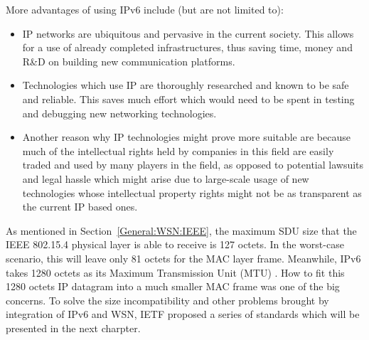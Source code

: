 More advantages of using IPv6 include (but are not limited to):  
\begin{itemize}
\item IP networks are ubiquitous and pervasive in the current society.  This allows for a use of already completed infrastructures, thus saving time, money and R\&D on building new communication platforms.
\newline
 
\item Technologies which use IP are thoroughly researched and known to be safe and reliable.  This saves much effort which would need to be spent in testing and debugging new networking technologies. 
\newline

\item Another reason why IP technologies might prove more suitable are because much of the intellectual rights held by companies in this field are easily traded and used by many players in the field, as opposed to potential lawsuits and legal hassle which might arise due to large-scale usage of new technologies whose intellectual property rights might not be as transparent as the current IP based ones.
\newline

\end{itemize}

As mentioned in Section~\ref{General:WSN:IEEE}, the maximum SDU size that the IEEE 802.15.4 physical layer is able to receive is 127 octets. In the worst-case scenario, this will leave only 81 octets for the MAC layer frame. Meanwhile, IPv6 takes 1280 octets as its Maximum Transmission Unit (MTU) \cite{RFC 4919}. How to fit this 1280 octets IP datagram into a much smaller MAC frame was one of the big concerns. To solve the  size incompatibility and other problems brought by integration of IPv6 and WSN, IETF proposed a series of standards which will be presented in the next charpter.



